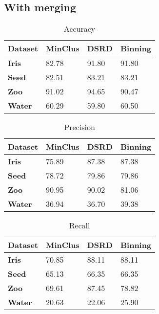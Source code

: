 \subsection{With merging}

\begin{table}[H]
\caption{Accuracy} 
\begin{center}
		\begin{tabular}{ | l | l | l | l |}
				\hline

				\textbf{Dataset} & \textbf{MinClus} & \textbf{DSRD} & \textbf{Binning} \\ \hline
                \textbf{Iris} & 82.78 & 91.80 & 91.80 \\ \hline
                \textbf{Seed} & 82.51 & 83.21 & 83.21 \\ \hline
                \textbf{Zoo} & 91.02 & 94.65 & 90.47  \\ \hline
                \textbf{Water} & 60.29 & 59.80 & 60.50  \\ \hline
		\end{tabular}
\end{center}
\label{table:acc2}
\end{table}



\begin{table}[H]
\caption{Precision} 
\begin{center}
		\begin{tabular}{ | l | l | l | l |}
				\hline

				\textbf{Dataset} & \textbf{MinClus} & \textbf{DSRD} & \textbf{Binning} \\ \hline

				\textbf{Iris} & 75.89 & 87.38 & 87.38 \\ \hline
				\textbf{Seed} & 78.72 & 79.86 & 79.86 \\ \hline
				\textbf{Zoo}  & 90.95 & 90.02 & 81.06 \\ \hline
				\textbf{Water}& 36.94 & 36.70 & 39.38 \\ \hline
		\end{tabular}
\end{center}
\label{table:pre2}
\end{table}

\begin{table}[H]
\caption{Recall} 
\begin{center}
		\begin{tabular}{ | l | l | l | l |}
				\hline

				\textbf{Dataset} & \textbf{MinClus} & \textbf{DSRD} & \textbf{Binning} \\ \hline

				\textbf{Iris}  & 70.85 & 88.11 & 88.11 \\ \hline
				\textbf{Seed}  & 65.13 & 66.35 & 66.35  \\ \hline
				\textbf{Zoo}   & 69.61 & 87.45 & 78.82  \\ \hline
				\textbf{Water} & 20.63 & 22.06 & 25.90 \\ \hline
		\end{tabular}
\end{center}
\label{table:rec2}
\end{table}


